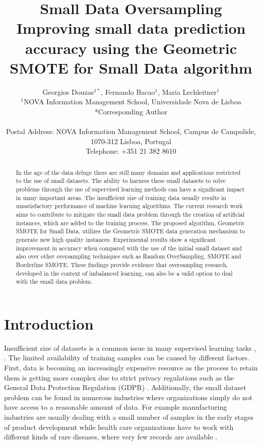 \documentclass[parskip=full]{scrartcl}
\title{Small Data Oversampling  \\ \LARGE{Improving small data prediction accuracy using the Geometric SMOTE for Small Data algorithm}}
\author{
	Georgios Douzas\(^{1*}\), Fernando Bacao\(^{1}\), Maria Lechleitner\(^{1}\) 
	\\
	\small{\(^{1}\)NOVA Information Management School, Universidade Nova de Lisboa}
	\\
	\small{*Corresponding Author}
	\\
	\\
	\small{Postal Address: NOVA Information Management School, Campus de Campolide, 1070-312 Lisboa, Portugal}
	\\
	\small{Telephone: +351 21 382 8610}
}
\date{}
\begin{document}
\maketitle

\begin{abstract}
In the age of the data deluge there are still many domains and applications restricted to the use of small datasets. The ability to harness these small datasets to solve problems through the use of supervised learning methods can have a significant impact in many important areas. The insufficient size of training data usually results in unsatisfactory performance of machine learning algorithms. The current research work aims to contribute to mitigate the small data problem through the creation of artificial instances, which are added to the training process. The proposed algorithm, Geometric SMOTE for Small Data, utilizes the Geometric SMOTE data generation mechanism to generate new high quality instances. Experimental results show a significant improvement in accuracy when compared with the use of the initial small dataset and also over other oversampling techniques such as Random OverSampling, SMOTE and Borderline SMOTE. These findings provide evidence that oversampling research, developed in the context of imbalanced learning, can also be a valid option to deal with the small data problem.
\end{abstract}

\section{Introduction}
Insufficient size of datasets is a common issue in many supervised learning tasks \cite{Niyogi.1998}, \cite{AbdulLateh.2017}. The limited availability of training samples can be caused by different factors. First, data is becoming an increasingly expensive resource \cite{Li.2007} as the process to retain them is getting more complex due to strict privacy regulations such as the General Data Protection Regulation (GDPR) \cite{EuropeanCommission.2019}. Additionally, the small dataset problem can be found in numerous industries where organizations simply do not have access to a reasonable amount of data. For example manufacturing industries are usually dealing with a small number of samples in the early stages of product development while health care organizations have to work with different kinds of rare diseases, where very few records are available \cite{AbdulLateh.2017}.
\end{document}
